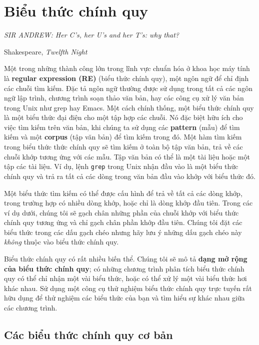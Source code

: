 \section{Biểu thức chính quy}

\setlength{}
\epigraphfontsize{\small}
\epigraph{
{\textit{SIR ANDREW: \hspace{0.15cm}Her C’s, her U’s and her T’s: why that?}
}
}{Shakespeare, \textit{Twelfth Night}}

Một trong những thành công lớn trong lĩnh vực chuẩn hóa ở khoa học máy tính là \textbf{regular expression (RE)} (biểu thức chính quy), một ngôn ngữ để chỉ định các chuỗi tìm kiếm. Đặc tả ngôn ngữ thường được sử dụng trong tất cả các ngôn ngữ lập trình, chương trình soạn thảo văn bản, hay các công cụ xử lý văn bản trong Unix như grep hay Emacs. Một cách chính thống, một biểu thức chính quy là một biểu thức đại điện cho một tập hợp các chuỗi. Nó đặc biệt hữu ích cho việc tìm kiếm trên văn bản, khi chúng ta sử dụng các \textbf{pattern} (mẫu) để tìm kiếm và một \textbf{corpus} (tập văn bản) để tìm kiếm trong đó. Một hàm tìm kiếm trong biểu thức thức chính quy sẽ tìm kiếm ở toàn bộ tập văn bản, trả về các chuỗi khớp tương ứng với các mẫu. Tập văn bản có thể là một tài liệu hoặc một tập các tài liệu. Ví dụ, lệnh \verb|grep| trong Unix nhận đầu vào là một biểu thức chính quy và trả ra tất cả các dòng trong văn bản đầu vào khớp với biểu thức đó.

Một biểu thức tìm kiếm có thể được cấu hình để trả về tất cả các dòng khớp, trong trường hợp có nhiều dòng khớp, hoặc chỉ là dòng khớp đầu tiên. Trong các ví dụ dưới, chúng tôi sẽ gạch chân những phần của chuỗi khớp với biểu thức chính quy tương ứng và chỉ gạch chân phần khớp đầu tiên. Chúng tôi đặt các biểu thức trong các dấu gạch chéo nhưng hãy lưu ý những dấu gạch chéo này \textit{không} thuộc vào biểu thức chính quy.

Biểu thức chính quy có rất nhiều biến thể. Chúng tôi sẽ mô tả \textbf{dạng mở rộng của biểu thức chính quy}; có những chương trình phân tích biểu thức chính quy có thể chỉ nhận một vài biểu thức, hoặc có thể xử lý một vài biểu thức hơi khác nhau. Sử dụng một công cụ thử nghiệm biểu thức chính quy trực tuyến rất hữu dụng để thử nghiệm các biểu thức của bạn và tìm hiểu sự khác nhau giữa các chương trình.

\subsection{Các biểu thức chính quy cơ bản}

